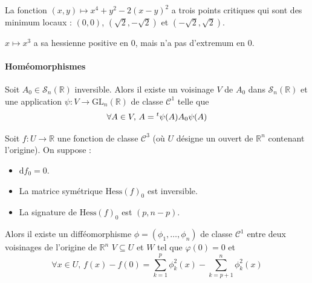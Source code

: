   \begin{example}
    La fonction $(x,y) \mapsto x^4 + y^2 - 2(x-y)^2$ a trois points critiques qui sont des minimum locaux : $(0,0)$, $(\sqrt{2},-\sqrt{2})$ et $(-\sqrt{2},\sqrt{2})$.
  \end{example}

  \begin{cexample}
    $x \mapsto x^3$ a sa hessienne positive en $0$, mais n'a pas d'extremum en $0$.
  \end{cexample}

  \paragraph{Homéomorphismes}


  \begin{lemma}
    Soit $A_0 \in \mathcal{S}_n(\mathbb{R})$ inversible. Alors il existe un voisinage $V$ de $A_0$ dans $\mathcal{S}_n(\mathbb{R})$ et une application $\psi : V \rightarrow \mathrm{GL}_n(\mathbb{R})$ de classe $\mathcal{C}^1$ telle que
    \[ \forall A \in V, \, A = \mathstrut ^t \psi(A) A_0 \psi(A) \]
  \end{lemma}


  \begin{lemma}
    Soit $f : U \rightarrow \mathbb{R}$ une fonction de classe $\mathcal{C}^3$ (où $U$ désigne un ouvert de $\mathbb{R}^n$ contenant l'origine). On suppose :
    \begin{itemize}
      \item $\mathrm{d} f_0 = 0$.
      \item La matrice symétrique $\mathrm{Hess} (f)_0$ est inversible.
      \item La signature de $\mathrm{Hess}(f)_0$ est $(p, n-p)$.
    \end{itemize}
    Alors il existe un difféomorphisme $\phi = (\phi_1, \dots, \phi_n)$ de classe $\mathcal{C}^1$ entre deux voisinages de l'origine de $\mathbb{R}^n$ $V \subseteq U$ et $W$ tel que $\varphi(0) = 0$ et
    \[ \forall x \in U, \, f(x) - f(0) = \sum_{k=1}^p \phi_k^2(x) - \sum_{k=p+1}^n \phi_k^2(x) \]
  \end{lemma}


